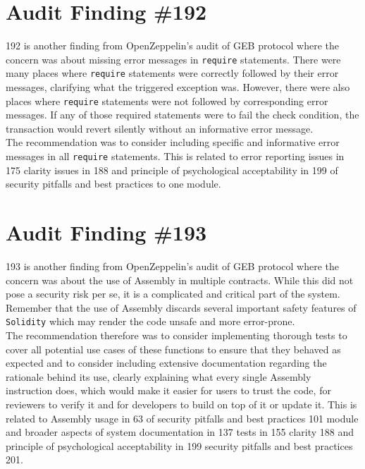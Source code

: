 \section{Audit Finding \#192}

192 is another finding from OpenZeppelin's audit of GEB protocol where the concern was about missing error messages in \verb|require| statements. There were many places where \verb|require| statements were correctly followed by their error messages, clarifying what the triggered exception was. However, there were also places where \verb|require| statements were not followed by corresponding error messages. If any of those required statements were to fail the check condition, the transaction would revert silently without an informative error message.\\

The recommendation was to consider including specific and informative error messages in all \verb|require| statements. This is related to error reporting issues in 175 clarity issues in 188 and principle of psychological acceptability in 199 of security pitfalls and best practices to one module.

\section{Audit Finding \#193}

193 is another finding from OpenZeppelin's audit of GEB protocol where the concern was about the use of Assembly in multiple contracts. While this did not pose a security risk per se, it is a complicated and critical part of the system. Remember that the use of Assembly discards several important safety features of \verb|Solidity| which may render the code unsafe and more error-prone.\\

The recommendation therefore was to consider implementing thorough tests to cover all potential use cases of these functions to ensure that they behaved as expected and to consider including extensive documentation regarding the rationale behind its use, clearly explaining what every single Assembly instruction does, which would make it easier for users to trust the code, for reviewers to verify it and for developers to build on top of it or update it. This is related to Assembly usage in 63 of security pitfalls and best practices 101 module and broader aspects of system documentation in 137 tests in 155 clarity 188 and principle of psychological acceptability in 199 security pitfalls and best practices 201.

